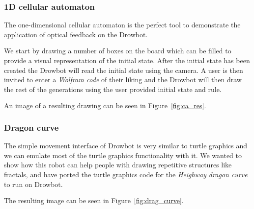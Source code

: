 \documentclass[a4paper,10pt]{article}
\begin{document}
\subsubsection*{1D cellular automaton}


The one-dimensional cellular automaton\cite{elemca} is the perfect
tool to demonstrate the application of optical feedback on the Drowbot.

We start by drawing a number of boxes on the board which can be
filled to provide a visual representation of the initial state.
After the initial state has been created the
Drowbot will read the initial state using the camera.
A user is then invited to enter a \emph{Wolfram code}\cite{elemca} of their liking
and the Drowbot will then draw the rest of the generations
using the user provided initial state and rule.

An image of a resulting drawing can be seen in Figure~\ref{fig:ca_res}.



\subsubsection*{Dragon curve}

The simple movement interface of Drowbot is very similar to
turtle graphics and we can emulate most of the turtle graphics
functionality with it.
We wanted to show how this robot can help people with drawing
repetitive structures like fractals, and have ported the turtle
graphics code for the \emph{Heighway dragon curve}\cite{dragon} to run on Drowbot.

The resulting image can be seen in Figure~\ref{fig:drag_curve}.
\end{document}
